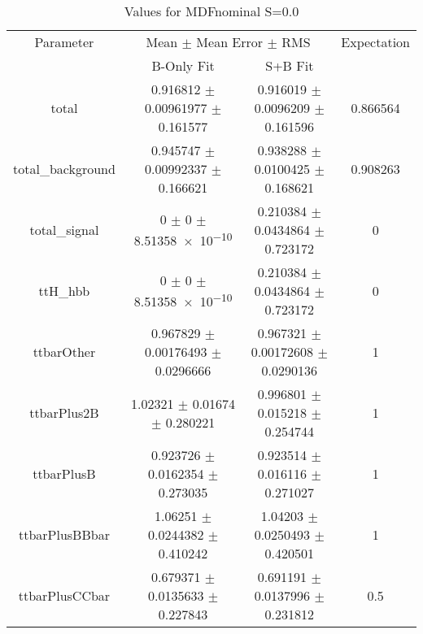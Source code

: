 \begin{table}
\centering
\caption{Values for MDFnominal S=0.0}
\begin{tabular}{cccc}
\toprule
Parameter & \multicolumn{2}{c}{Mean $\pm$ Mean Error $\pm$ RMS} & Expectation\\
 & B-Only Fit & S+B Fit & \\
\midrule
total & \num{0.916812} $\pm$ \num{0.00961977} $\pm$ \num{0.161577} & \num{0.916019} $\pm$ \num{0.0096209} $\pm$ \num{0.161596} & \num{0.866564}\\
total\_background & \num{0.945747} $\pm$ \num{0.00992337} $\pm$ \num{0.166621} & \num{0.938288} $\pm$ \num{0.0100425} $\pm$ \num{0.168621} & \num{0.908263}\\
total\_signal & \num{0} $\pm$ \num{0} $\pm$ \num{8.51358e-10} & \num{0.210384} $\pm$ \num{0.0434864} $\pm$ \num{0.723172} & \num{0}\\
ttH\_hbb & \num{0} $\pm$ \num{0} $\pm$ \num{8.51358e-10} & \num{0.210384} $\pm$ \num{0.0434864} $\pm$ \num{0.723172} & \num{0}\\
ttbarOther & \num{0.967829} $\pm$ \num{0.00176493} $\pm$ \num{0.0296666} & \num{0.967321} $\pm$ \num{0.00172608} $\pm$ \num{0.0290136} & \num{1}\\
ttbarPlus2B & \num{1.02321} $\pm$ \num{0.01674} $\pm$ \num{0.280221} & \num{0.996801} $\pm$ \num{0.015218} $\pm$ \num{0.254744} & \num{1}\\
ttbarPlusB & \num{0.923726} $\pm$ \num{0.0162354} $\pm$ \num{0.273035} & \num{0.923514} $\pm$ \num{0.016116} $\pm$ \num{0.271027} & \num{1}\\
ttbarPlusBBbar & \num{1.06251} $\pm$ \num{0.0244382} $\pm$ \num{0.410242} & \num{1.04203} $\pm$ \num{0.0250493} $\pm$ \num{0.420501} & \num{1}\\
ttbarPlusCCbar & \num{0.679371} $\pm$ \num{0.0135633} $\pm$ \num{0.227843} & \num{0.691191} $\pm$ \num{0.0137996} $\pm$ \num{0.231812} & \num{0.5}\\
\bottomrule
\end{tabular}
\end{table}